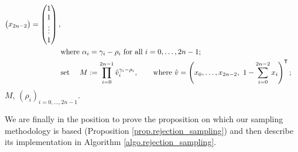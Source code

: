 \documentclass[10pt, article,table]{article}
\begin{document}
\begin{algorithm}[h]
\begin{algorithmic}
\begin{equation*}
\begin{split}
\begin{pmatrix}
   x_{2n-2}
  \end{pmatrix}
  = 
  \begin{pmatrix}
   1 \\
   1 \\
   \vdots \\
   1
  \end{pmatrix},
  \\
  & \text{where } \alpha_i = \gamma_i - \rho_i \text{ for all } i=0,\dots, 2n-1; 
  \\
  &\text{set } \quad M:= \prod_{i=0}^{2n-1} \hat{v}_{i}^{\gamma_i - \rho_i},
   \qquad \text{where }
   \hat{v} =
   \left(x_0,\dots,x_{2n-2}, \,\,  1-\sum_{i=0}^{2n-2}x_i\right)^{\mathsf{T}};
  \end{split}
  \end{equation*}
  \ENDIF
  \RETURN $M$, $(\rho_i)_{i=0,\dots,2n-1}$.
 \end{algorithmic}
\end{algorithm}

\newpage
 

We are finally in the position to prove the proposition on which our sampling methodology is based (Proposition \ref{prop.rejection_sampling}) and then describe its implementation in Algorithm \ref{algo.rejection_sampling}. 
\end{document}
